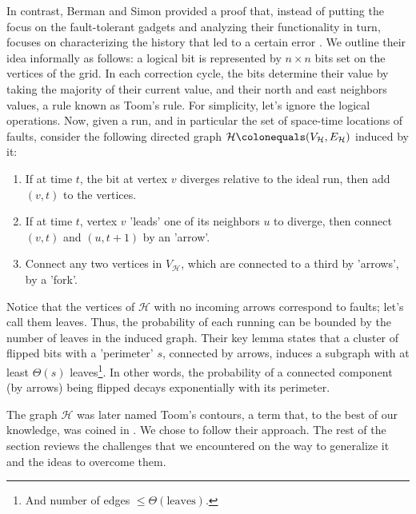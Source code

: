 In contrast, Berman and Simon provided a proof that, instead of putting the focus on the fault-tolerant gadgets and analyzing their functionality in turn, focuses on characterizing the history that led to a certain error \cite{Berman}. We outline their idea informally as follows: a logical bit is represented by $n \times n$ bits set on the vertices of the grid. In each correction cycle, the bits determine their value by taking the majority of their current value, and their north and east neighbors values, a rule known as Toom's rule. For simplicity, let's ignore the logical operations. Now, given a run, and in particular the set of space-time locations of faults, consider the following directed graph $\mathcal{H} \colonequals (V_{\mathcal{H}}, E_{\mathcal{H}})$ induced by it: 
\begin{enumerate}
  \item If at time $t$, the bit at vertex $v$ diverges relative to the ideal run, then add $(v,t)$ to the vertices. 
  \item If at time $t$, vertex $v$ 'leads' one of its neighbors $u$ to diverge, then connect $(v,t)$ and $(u,t+1)$ by an 'arrow'. 
  \item Connect any two vertices in $V_{\mathcal{H}}$, which are connected to a third by 'arrows', by a 'fork'. 
\end{enumerate}
Notice that the vertices of $\mathcal{H}$ with no incoming arrows correspond to faults; let's call them leaves. Thus, the probability of each running can be bounded by the number of leaves in the induced graph. Their key lemma states that a cluster of flipped bits with a 'perimeter' $s$, connected by arrows, induces a subgraph with at least $\Theta(s)$ leaves\footnote{ And number of edges $\le \Theta( \text{leaves} ) $.}. In other words, the probability of a connected component (by arrows) being flipped decays exponentially with its perimeter. 


The graph $\mathcal{H}$ was later named Toom's contours, a term that, to the best of our knowledge, was coined in \cite{swart2026peierlsboundstoomcontours}.
We chose to follow their approach. The rest of the section reviews the challenges that we encountered on the way to generalize it and the ideas to overcome them.



